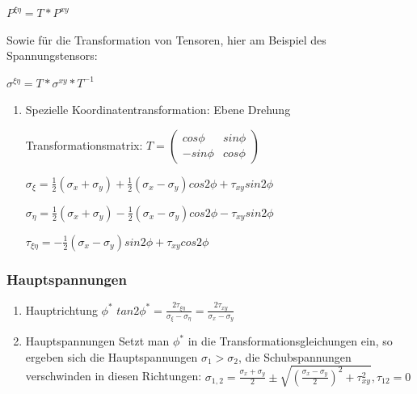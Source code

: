 \documentclass[11pt]{article}
\begin{document}
\(P^{\xi \eta} = T *  P^{xy}\)

Sowie für die Transformation von Tensoren, hier am Beispiel des Spannungstensors:

\(\sigma^{\xi \eta} = T * \sigma^{xy} *T^{-1}\)

\begin{enumerate}
\item Spezielle Koordinatentransformation: Ebene Drehung
\label{sec:org3f0725f}

Transformationsmatrix: \(T = \begin{pmatrix}
cos \phi & sin \phi \\
-sin\phi & cos\phi
\end{pmatrix}\)

\(\sigma_\xi = \frac{1}{2}(\sigma_x + \sigma_y) + \frac{1}{2}(\sigma_x - \sigma_y) cos2\phi + \tau_{xy} sin2\phi\)

\(\sigma_\eta = \frac{1}{2}(\sigma_x + \sigma_y) - \frac{1}{2}(\sigma_x - \sigma_y) cos2\phi - \tau_{xy} sin2\phi\)

\(\tau_{\xi \eta} =  - \frac{1}{2}(\sigma_x - \sigma_y) sin2\phi + \tau_{xy} cos2\phi\)
\end{enumerate}
\subsubsection{Hauptspannungen}
\label{sec:orgbb9c8fc}
\begin{enumerate}
\item Hauptrichtung \(\phi^*\)
\label{sec:org3fa23e9}
\(tan2\phi^* = \frac{2\tau_{\xi \eta}}{\sigma_\xi - \sigma_\eta} = \frac{2\tau_{xy}}{\sigma_x - \sigma_y}\)
\item Hauptspannungen
\label{sec:org559cfe0}
Setzt man \(\phi^*\) in die Transformationsgleichungen ein, so ergeben sich die Hauptspannungen \(\sigma_1 > \sigma_2\), die Schubspannungen verschwinden in diesen Richtungen:
\(\sigma_{1,2} = \frac{\sigma_x + \sigma_y}{2} \pm \sqrt{(\frac{\sigma_x - \sigma_y}{2})^2 + \tau_{xy}^2}, \tau_{12} = 0\)
\end{enumerate}
\end{document}
